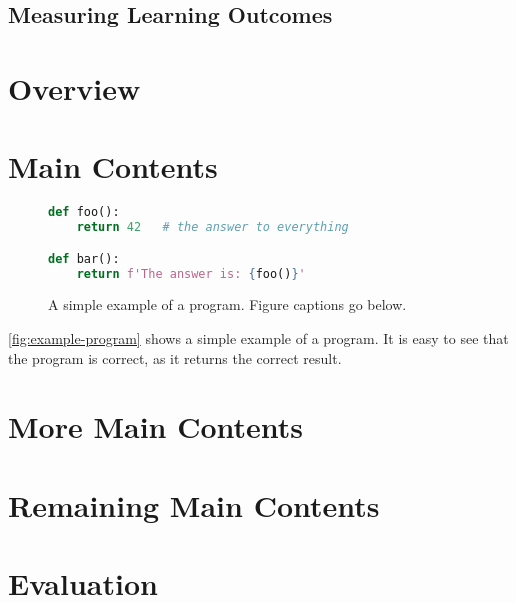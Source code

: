 \documentclass[seminar]{plai}
\begin{document}
\lipsum[1-3]

\subsection{Measuring Learning Outcomes}
\label{sec:learning-outcomes}

\lipsum[1-3]

\section{Overview}
\label{sec:overview}

\lipsum[1-3]


\section{Main Contents}
\label{sec:phrasing}

\lipsum[1-3]

\begin{figure}[t]
\begin{lstlisting}[language=Python]
def foo():
    return 42   # the answer to everything

def bar():
    return f'The answer is: {foo()}'
\end{lstlisting}
\caption{A simple example of a program. Figure captions go below.}
\label{fig:example-program}
\end{figure}

\autoref{fig:example-program} shows a simple example of a program. It is easy to see that the program is correct, as it returns the correct result.


\section{More Main Contents}
\label{sec:transfer}

\lipsum[1-3]


\section{Remaining Main Contents}
\label{sec:remaining}

\lipsum[1-3]


\section{Evaluation}
\label{sec:evaluation}
\end{document}
